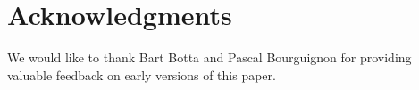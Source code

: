 \section{Acknowledgments} 

We would like to thank Bart Botta and Pascal Bourguignon for providing
valuable feedback on early versions of this paper.
